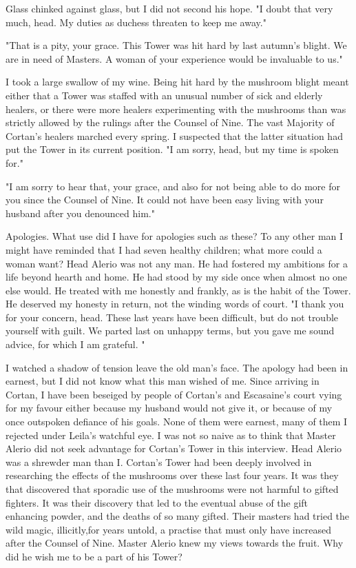\documentclass{article}
\begin{document}
Glass chinked against glass, but I did not second his hope. "I doubt that very much, head. My duties as duchess threaten to keep me away."

"That is a pity, your grace. This Tower was hit hard by last autumn's blight. We are in need of Masters. A woman of your experience would be invaluable to us."

I took a large swallow of my wine. Being hit hard by the mushroom blight meant either that a Tower was staffed with an unusual number of sick and elderly healers, or there were more healers experimenting with the mushrooms than was strictly allowed by the rulings after the Counsel of Nine. The vast Majority of Cortan's healers marched every spring. I suspected that the latter situation had put the Tower in its current position. "I am sorry, head, but my time is spoken for."

"I am sorry to hear that, your grace, and also for not being able to do more for you since the Counsel of Nine. It could not have been easy living with your husband after you denounced him."

Apologies. What use did I have for apologies such as these? To any other man I might have reminded that I had seven healthy children; what more could a woman want? Head Alerio was not any man. He had fostered my ambitions for a life beyond hearth and home. He had stood by my side once when almost no one else would. He treated with me honestly and frankly, as is the habit of the Tower. He deserved my honesty in return, not the winding words of court. "I thank you for your concern, head. These last years have been difficult, but do not trouble yourself with guilt. We parted last on unhappy terms, but you gave me sound advice, for which I am grateful. "

I watched a shadow of tension leave the old man's face. The apology had been in earnest, but I did not know what this man wished of me. Since arriving in Cortan, I have been beseiged by people of Cortan's and Escasaine's court vying for my favour either because my husband would not give it, or because of my once outspoken defiance of his goals. None of them were earnest, many of them I rejected under Leila's watchful eye. I was not so naive as to think that Master Alerio did not seek advantage for Cortan's Tower in this interview. Head Alerio was a shrewder man than I. Cortan's Tower had been deeply involved in researching the effects of the mushrooms over these last four years. It was they that discovered that sporadic use of the mushrooms were not harmful to gifted fighters. It was their discovery that led to the eventual abuse of the gift enhancing powder, and the deaths of so many gifted. Their masters had tried the wild magic, illicitly,for years untold, a practise that must only have increased after the Counsel of Nine. Master Alerio knew my views towards the fruit. Why did he wish me to be a part of his Tower?
\end{document}
